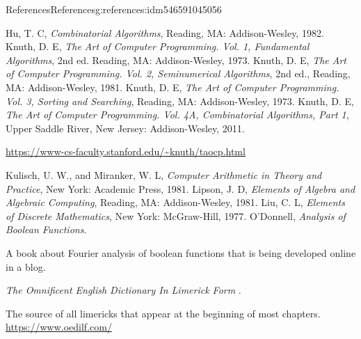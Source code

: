 \documentclass[oneside,10pt,]{book}
\numberwithin{equation}{section}
\begin{document}
\begin{references-chapter-numberless}{References}{}{References}{}{}{g:references:idm546591045056}
\begin{referencelist}
\hypertarget{x:biblio:biblio-hu-1982}{}Hu, T. C, \textit{Combinatorial Algorithms}, Reading, MA: Addison-Wesley, 1982.
\hypertarget{x:biblio:biblio-knuth-1978}{}Knuth, D. E, \textit{The Art of Computer Programming. Vol. 1, Fundamental Algorithms}, 2nd ed. Reading, MA: Addison-Wesley, 1973.
\hypertarget{x:biblio:biblio-knuth-1981}{}Knuth, D. E, \textit{The Art of Computer Programming. Vol. 2, Seminumerical Algorithms}, 2nd ed., Reading, MA: Addison-Wesley, 1981.
\hypertarget{x:biblio:biblio-knuth-1973}{}Knuth, D. E, \textit{The Art of Computer Programming. Vol. 3, Sorting and Searching}, Reading, MA: Addison-Wesley, 1973.
\hypertarget{x:biblio:biblio-knuth-2011}{}Knuth, D. E, \textit{The Art of Computer Programming. Vol. 4A, Combinatorial Algorithms, Part 1}, Upper Saddle River, New Jersey: Addison-Wesley, 2011.\par%
\href{https://www-cs-faculty.stanford.edu/\~knuth/taocp.html}{https:\slash{}\slash{}www-cs-faculty.stanford.edu\slash{}\textasciitilde{}knuth\slash{}taocp.html}%

\hypertarget{x:biblio:biblio-kulisch-1981}{}Kulisch, U. W., and Miranker, W. L, \textit{Computer Arithmetic in Theory and Practice}, New York: Academic Press, 1981.
\hypertarget{x:biblio:biblio-lipson-1981}{}Lipson, J. D, \textit{Elements of Algebra and Algebraic Computing}, Reading, MA: Addison-Wesley, 1981.
\hypertarget{x:biblio:biblio-liu-1977}{}Liu, C. L, \textit{Elements of Discrete Mathematics}, New York: McGraw-Hill, 1977.
\hypertarget{x:biblio:biblio-odonnell-2019}{}O'Donnell, \textit{Analysis of Boolean Functions}. \par%
A book about Fourier analysis of boolean functions that is being developed online in a blog.%

\hypertarget{x:biblio:biblio-limerick-2020}{}\textit{The Omnificent English Dictionary In Limerick Form} . \par%
The source of all limericks that appear at the beginning of most chapters. \href{https://www.oedilf.com/}{https:\slash{}\slash{}www.oedilf.com\slash{}}%


\end{referencelist}
\end{references-chapter-numberless}
\end{document}
